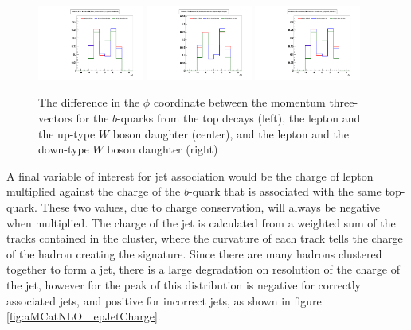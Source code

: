 \begin{figure}[hbtp] 
  {\centering
    \includegraphics[width=0.31\textwidth]{Figures/Analysis_Improvement_Diagrams/tt012jets__h_genParticle_ttbarZMFrame_topsRest_deltaPhi_lepB_hadB__vs__h_recoJets_correctAssoc_ttbarZMFrame_topsRest_deltaPhi_lepB_hadB__vs__h_recoJets_wrongAssoc_ttbarZMFrame_topsRest_deltaPhi_lepB_hadB__unitNorm.pdf}
    \includegraphics[width=0.31\textwidth]{Figures/Analysis_Improvement_Diagrams/tt012jets__h_genParticle_ttbarZMFrame_topsRest_deltaPhi_lep_hadWupQ__vs__h_recoJets_correctAssoc_ttbarZMFrame_topsRest_deltaPhi_lep_hadWupQ__vs__h_recoJets_wrongAssoc_ttbarZMFrame_topsRest_deltaPhi_lep_hadWupQ__unitNorm.pdf}
    \includegraphics[width=0.31\textwidth]{Figures/Analysis_Improvement_Diagrams/tt012jets__h_genParticle_ttbarZMFrame_topsRest_deltaPhi_lepB_hadB__vs__h_recoJets_correctAssoc_ttbarZMFrame_topsRest_deltaPhi_lepB_hadB__vs__h_recoJets_wrongAssoc_ttbarZMFrame_topsRest_deltaPhi_lepB_hadB__unitNorm.pdf}
    \caption{The difference in the $\phi$ coordinate between the momentum
      three-vectors for the $b$-quarks from the top decays (left), the
    lepton and the up-type $W$ boson daughter (center), and the lepton
  and the down-type $W$ boson daughter (right)}
    \label{fig:aMCatNLO_deltaPhi}}
\end{figure}

\par A final variable of interest for jet association would be the
charge of lepton multiplied against the charge of the $b$-quark that
is associated with the same top-quark.  These two values, due to
charge conservation, will always be negative when multiplied.  The
charge of the jet is calculated from a \PT weighted sum of the tracks
contained in the cluster, where the curvature of each track tells the
charge of the hadron creating the signature.  Since there are many
hadrons clustered together to form a jet, there is a large degradation
on resolution of the charge of the jet, however for the peak of this
distribution is negative for correctly associated jets, and positive
for incorrect jets, as shown in figure
\ref{fig:aMCatNLO_lepJetCharge}.  

